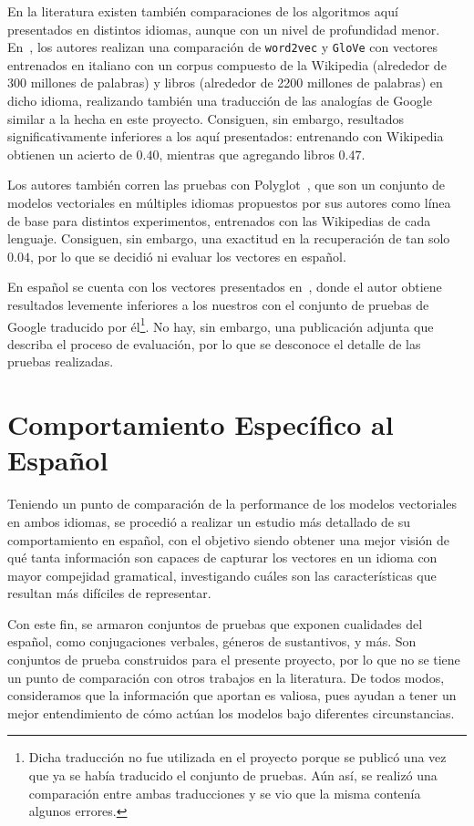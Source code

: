 En la literatura existen también comparaciones de los algoritmos aquí presentados en distintos
idiomas, aunque con un nivel de profundidad menor. En~\cite{Berardi2015}, los autores realizan una
comparación de \texttt{word2vec} y \texttt{GloVe} con vectores entrenados en italiano con un corpus
compuesto de la Wikipedia (alrededor de 300 millones de palabras) y libros (alrededor de 2200
millones de palabras) en dicho idioma, realizando también una traducción de las analogías de Google
similar a la hecha en este proyecto. Consiguen, sin embargo, resultados significativamente
inferiores a los aquí presentados: entrenando con Wikipedia obtienen un acierto de $0.40$, mientras
que agregando libros $0.47$.

Los autores también corren las pruebas con Polyglot~\cite{AlRfou2013}, que son un conjunto de
modelos vectoriales en múltiples idiomas propuestos por sus autores como línea de base para
distintos experimentos, entrenados con las Wikipedias de cada lenguaje. Consiguen, sin embargo, una
exactitud en la recuperación de tan solo $0.04$, por lo que se decidió ni evaluar los vectores en
español.

En español se cuenta con los vectores presentados en~\cite{SBWCE}, donde el autor obtiene resultados
levemente inferiores a los nuestros con el conjunto de pruebas de Google traducido por
él\footnote{Dicha traducción no fue utilizada en el proyecto porque se publicó una vez que ya se
había traducido el conjunto de pruebas. Aún así, se realizó una comparación entre ambas traducciones
y se vio que la misma contenía algunos errores.}. No hay, sin embargo, una publicación adjunta que
describa el proceso de evaluación, por lo que se desconoce el detalle de las pruebas realizadas.


\section{Comportamiento Específico al Español}

Teniendo un punto de comparación de la performance de los modelos vectoriales en ambos idiomas, se
procedió a realizar un estudio más detallado de su comportamiento en español, con el objetivo siendo
obtener una mejor visión de qué tanta información son capaces de capturar los vectores en un idioma
con mayor compejidad gramatical, investigando cuáles son las características que resultan más
difíciles de representar.

Con este fin, se armaron conjuntos de pruebas que exponen cualidades del español, como conjugaciones
verbales, géneros de sustantivos, y más. Son conjuntos de prueba construidos para el presente
proyecto, por lo que no se tiene un punto de comparación con otros trabajos en la literatura. De
todos modos, consideramos que la información que aportan es valiosa, pues ayudan a tener un mejor
entendimiento de cómo actúan los modelos bajo diferentes circunstancias.


